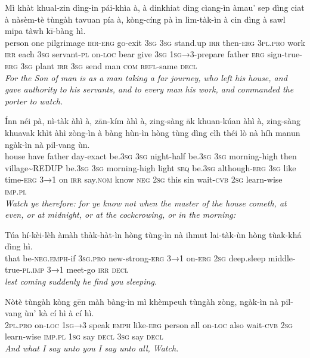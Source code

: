 \documentclass[11pt,a4paper]{article}
\begin{document}
\begin{exe}
\gll Mì khàt khual-zin dìng-ìn pái-khìa à, à dinkhiat dìng cìang-ìn àmau' sep dìng ciat à nàsèm-tè tùngàh tavuan pía à, kòng-cíng pà ìn lìm-tàk-ìn à cin dìng à sawl mipa tàwh kī-bàng hì. \\
     person one pilgrimage \textsc{irr}-\textsc{erg} go-exit \textsc{3sg} \textsc{3sg} stand.up \textsc{irr} then-\textsc{erg} \textsc{3pl}.\textsc{pro} work \textsc{irr} each \textsc{3sg} servant-\textsc{pl} on-\textsc{loc} bear give \textsc{3sg} \textsc{1sg→3}-prepare father \textsc{erg} sign-true-\textsc{erg} \textsc{3sg} plant \textsc{irr} \textsc{3sg} send man \textsc{com} \textsc{refl}-same \textsc{decl} \\
\glt \textcolor{kjvcolor}{\textit{For the Son of man is as a man taking a far journey, who left his house, and gave authority to his servants, and to every man his work, and commanded the porter to watch.}}

\gll Ínn néi pà, nì-tàk àhì à, zān-kím àhì à, zing-sàng āk khuan-kúan àhì à, zing-sàng khuavak khìt àhì zòng-ìn à bàng hùn-ìn hòng tùng dìng cìh théi lò nà híh manun ngàk-ìn nà pil-vang ùn. \\
     house have father day-exact be.\textsc{3sg} \textsc{3sg} night-half be.\textsc{3sg} \textsc{3sg} morning-high then village\textasciitilde{}REDUP be.\textsc{3sg} \textsc{3sg} morning-high light \textsc{seq} be.\textsc{3sg} although-\textsc{erg} \textsc{3sg} like time-\textsc{erg} \textsc{3→1} on \textsc{irr} say.\textsc{nom} know \textsc{neg} \textsc{2sg} this sin wait-\textsc{cvb} \textsc{2sg} learn-wise \textsc{imp}.\textsc{pl} \\
\glt \textcolor{kjvcolor}{\textit{Watch ye therefore: for ye know not when the master of the house cometh, at even, or at midnight, or at the cockcrowing, or in the morning:}}

\gll Túa hí-kèi-lèh àmàh thàk-hàt-ìn hòng tùng-ìn nà ihmut lai-tàk-ùn hòng tùak-khá dìng hì. \\
     that be-\textsc{neg}.\textsc{emph}-if \textsc{3sg}.\textsc{pro} new-strong-\textsc{erg} \textsc{3→1} on-\textsc{erg} \textsc{2sg} deep.sleep middle-true-\textsc{pl}.\textsc{imp} \textsc{3→1} meet-go \textsc{irr} \textsc{decl} \\
\glt \textcolor{kjvcolor}{\textit{lest coming suddenly he find you sleeping.}}

\gll Nòtè tùngàh kòng gēn màh bàng-ìn mì khèmpeuh tùngàh zòng, ngàk-ìn nà pil-vang ùn' kà cí hì à cí hì. \\
     \textsc{2pl}.\textsc{pro} on-\textsc{loc} \textsc{1sg→3} speak \textsc{emph} like-\textsc{erg} person all on-\textsc{loc} also wait-\textsc{cvb} \textsc{2sg} learn-wise \textsc{imp}.\textsc{pl} \textsc{1sg} say \textsc{decl} \textsc{3sg} say \textsc{decl} \\
\glt \textcolor{kjvcolor}{\textit{And what I say unto you I say unto all, Watch.}}

\end{exe}
\newpage
\end{document}
